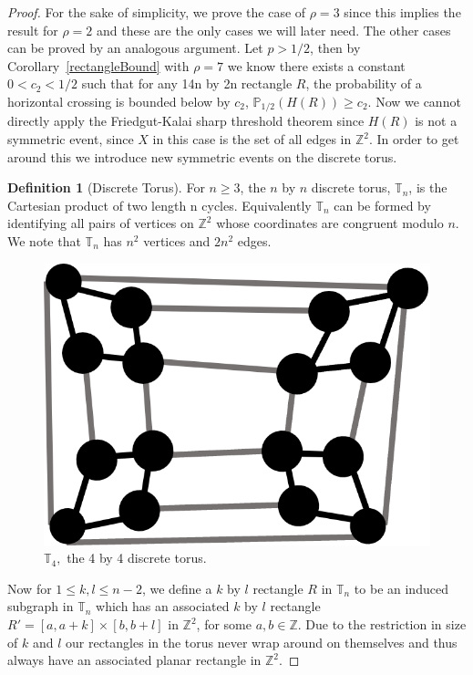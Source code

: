 \documentclass[a4paper,11pt]{article}
\theoremstyle{definition}
\newtheorem{definition}[theorem]{Definition}
\newcommand{\ints}{\mathbb{Z}}
\begin{document}
\begin{proof}
	For the sake of simplicity, we prove the case of $\rho = 3$ since this implies the result for $\rho =2$ and these are the only cases we will later need. The other cases can be proved by an analogous argument. Let $p>1/2$, then by Corollary~\ref*{rectangleBound} with $\rho = 7$ we know there exists a constant $0<c_2<1/2$ such that for any 14n by 2n rectangle $R$, the probability of a horizontal crossing is bounded below by $c_2$, $\mathbb{P}_{1/2}(H(R)) \geq c_2$. Now we cannot directly apply the Friedgut-Kalai sharp threshold theorem since $H(R)$ is not a symmetric event, since $X$ in this case is the set of all edges in $\ints^2$. In order to get around this we introduce new symmetric events on the discrete torus. 
	\begin{definition}[Discrete Torus]
	For $n \geq 3$, the $n$ by $n$ discrete torus, $\mathbb{T}_n$, is the Cartesian product of two length n cycles. Equivalently $\mathbb{T}_n$ can be formed by identifying all pairs of vertices on $\ints^2$ whose coordinates are congruent modulo $n$. We note that $\mathbb{T}_n$ has $n^2$ vertices and $2n^2$ edges.
	\end{definition}

	\begin{figure}
		\centering
		\includegraphics[scale=0.8]{drawings/torus.png}
		\caption{$\mathbb{T}_4,$ the 4 by 4 discrete torus.}
		\label{fig:torus}
	\end{figure}

	Now for $1 \leq k,l \leq n-2$, we define a $k$ by $l$ rectangle $R$ in $\mathbb{T}_n$ to be an induced subgraph in $\mathbb{T}_n$ which has an associated $k$ by $l$ rectangle $R' = [a,a+k] \times [b,b+l]$ in $\ints^2$, for some $a,b \in \ints$. Due to the restriction in size of $k$ and $l$ our rectangles in the torus never wrap around on themselves and thus always have an associated planar rectangle in $\ints^2$.
	

\end{proof}
\end{document}
